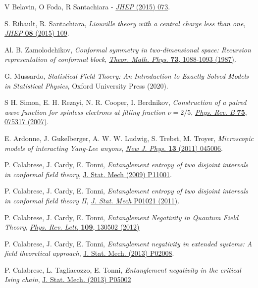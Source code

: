 \documentclass[a4paper,11pt]{article}
\begin{document}
\begin{thebibliography}{99}
 V Belavin, O Foda, R Santachiara - \href{https://doi.org/10.1007/JHEP10(2015)073}{\emph{JHEP} (2015) 073}.

 S. Ribault, R. Santachiara, \textit{Liouville theory with a central charge less than one}, 
\href{https://doi.org/10.1007/JHEP08(2015)109}{\emph{JHEP} {\bf 08} (2015) 109}.

 Al. B. Zamolodchikov, \emph{Conformal symmetry in two-dimensional space: Recursion representation of conformal
block}, \href{https://doi.org/10.1007/BF01022967}{\emph{Theor. Math. Phys.} {\bf 73}, 1088-1093  (1987)}.

 G. Mussardo, \emph{Statistical Field Thoery: An Introduction to Exactly Solved Models in Statistical Physics}, Oxford University Press (2020).

 S H. Simon, E. H. Rezayi, N. R. Cooper, I. Berdnikov, \emph{Construction of a paired wave function for spinless electrons at filling fraction $\nu=2/5$}, \href{https://doi.org/10.1103/PhysRevB.75.075317}{\emph{Phys. Rev. B} {\bf 75}, 075317 (2007)}.

 E. Ardonne, J. Gukelberger, A. W. W. Ludwig, S. Trebst, M. Troyer, \emph{Microscopic models of interacting Yang-Lee anyons},
\href{https://doi.org/10.1088/1367-2630/13/4/045006}{\emph{New J. Phys.} {\bf 13} (2011) 045006}.

 P. Calabrese, J. Cardy, E. Tonni, \emph{Entanglement entropy of two disjoint intervals in conformal field theory},
\href{https://doi.org/10.1088/1742-5468/2009/11/P11001}{J. Stat. Mech (2009) P11001}.

 P. Calabrese, J. Cardy, E. Tonni, \emph{Entanglement entropy of two disjoint intervals in conformal field theory II}, \href{https://doi.org/10.1088/1742-5468/2011/01/P01021}{\emph{J. Stat. Mech} P01021 (2011)}.


 P. Calabrese, J. Cardy, E. Tonni, \emph{Entanglement Negativity in Quantum Field Theory},
\href{https://doi.org/10.1103/PhysRevLett.109.130502}{\emph{Phys. Rev. Lett.} {\bf 109}, 130502 (2012)}

 P. Calabrese, J. Cardy, E. Tonni, \emph{Entanglement negativity in extended systems:  A field theoretical approach},
\href{https://doi.org/10.1088/1742-5468/2013/02/P02008}{J. Stat. Mech. (2013) P02008}.

 P. Calabrese, L. Tagliacozzo, E. Tonni, \emph{Entanglement negativity in the critical Ising chain}, 
\href{https://doi.org/10.1088/1742-5468/2013/05/P05002}{J. Stat. Mech. (2013) P05002}


\end{thebibliography}
\end{document}
